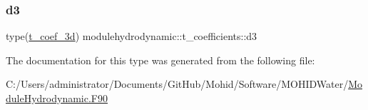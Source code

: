 \mbox{\label{structmodulehydrodynamic_1_1t__coefficients_aec0a7750b033482743e22ee4740d8cea}} 
\subsubsection{\texorpdfstring{d3}{d3}}
{\footnotesize\ttfamily type(\mbox{\hyperlink{structmodulehydrodynamic_1_1t__coef__3d}{t\+\_\+coef\+\_\+3d}}) modulehydrodynamic\+::t\+\_\+coefficients\+::d3\hspace{0.3cm}{\ttfamily [private]}}



The documentation for this type was generated from the following file\+:\begin{DoxyCompactItemize}
\item 
C\+:/\+Users/administrator/\+Documents/\+Git\+Hub/\+Mohid/\+Software/\+M\+O\+H\+I\+D\+Water/\mbox{\hyperlink{_module_hydrodynamic_8_f90}{Module\+Hydrodynamic.\+F90}}\end{DoxyCompactItemize}
